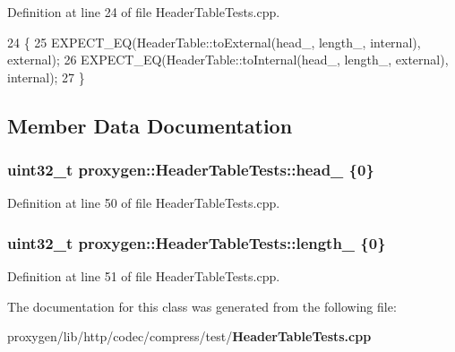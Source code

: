 Definition at line 24 of file Header\+Table\+Tests.\+cpp.


\begin{DoxyCode}
24                                                     \{
25     EXPECT\_EQ(HeaderTable::toExternal(head_, length_, \textcolor{keyword}{internal}), external);
26     EXPECT\_EQ(HeaderTable::toInternal(head_, length_, external), \textcolor{keyword}{internal});
27   \}
\end{DoxyCode}


\subsection{Member Data Documentation}
\subsubsection[{head\+\_\+}]{\setlength{\rightskip}{0pt plus 5cm}uint32\+\_\+t proxygen\+::\+Header\+Table\+Tests\+::head\+\_\+ \{0\}\hspace{0.3cm}{\ttfamily [protected]}}\label{classproxygen_1_1HeaderTableTests_a6f36a3eaa8cf4f8e59e3e2b56de63440}


Definition at line 50 of file Header\+Table\+Tests.\+cpp.

\subsubsection[{length\+\_\+}]{\setlength{\rightskip}{0pt plus 5cm}uint32\+\_\+t proxygen\+::\+Header\+Table\+Tests\+::length\+\_\+ \{0\}\hspace{0.3cm}{\ttfamily [protected]}}\label{classproxygen_1_1HeaderTableTests_a5c757f633e18e73931656e7e341f85c3}


Definition at line 51 of file Header\+Table\+Tests.\+cpp.



The documentation for this class was generated from the following file\+:\begin{DoxyCompactItemize}
\item 
proxygen/lib/http/codec/compress/test/{\bf Header\+Table\+Tests.\+cpp}\end{DoxyCompactItemize}
